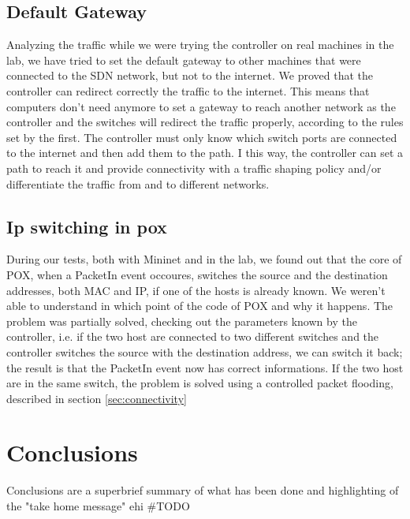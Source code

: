 \documentclass[article,10pt]{IEEEtran}
\begin{document}
\subsection{Default Gateway}
Analyzing the traffic while we were trying the controller on real machines in the lab, we have tried to set the default gateway to
other machines that were connected to the SDN network, but not to the internet. We proved that the controller can redirect correctly the
traffic to the internet. This means that
computers don't need anymore to set a gateway to reach another network as the controller and the switches will redirect the traffic
properly, according to the rules set by the first. The controller must only know which switch ports are connected to the
internet and then add them to the path. I this way, the controller can set a path to reach it and provide connectivity with
a traffic shaping policy and/or differentiate the traffic from and to different networks.

\subsection{Ip switching in pox}

During our tests, both with Mininet and in the lab, we found out that the core of POX, when a PacketIn event occoures, switches the source and the destination addresses,
both MAC and IP, if one of the hosts is already known. We weren't able to understand in which point of the code of POX  and why it happens.
The problem was partially solved, checking out the
parameters known by the controller, i.e. if the two host are connected to two different switches and the controller switches the source with the
destination address, we can switch it back; the result is that the PacketIn event now has correct informations.
If the two host are in the same switch, the problem is solved using a controlled packet flooding, described in section \ref{sec:connectivity}

\section{Conclusions}\label{sec:conclusion}
Conclusions are a superbrief summary of what has been done and highlighting of the "take home message"
ehi
\#TODO
\end{document}
